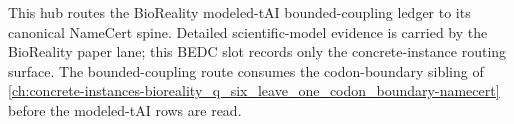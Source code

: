 This hub routes the BioReality modeled-tAI bounded-coupling ledger to its canonical NameCert spine.
Detailed scientific-model evidence is carried by the BioReality paper lane; this BEDC slot records only the concrete-instance routing surface.
The bounded-coupling route consumes the codon-boundary sibling of \autoref{ch:concrete-instances-bioreality_q_six_leave_one_codon_boundary-namecert} before the modeled-tAI rows are read.



